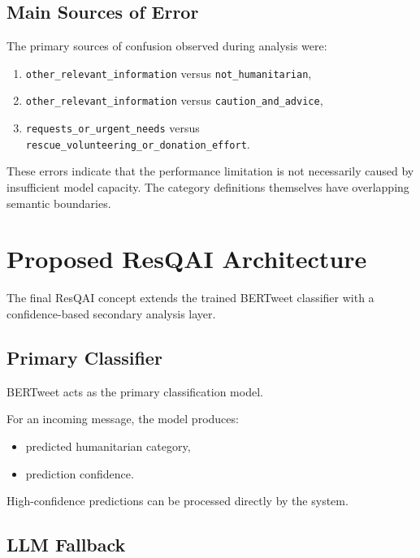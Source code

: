 \documentclass[12pt,a4paper]{article}
\begin{document}
\subsection{Main Sources of Error}

The primary sources of confusion observed during analysis were:

\begin{enumerate}
    \item \texttt{other\_relevant\_information} versus
    \texttt{not\_humanitarian},
    
    \item \texttt{other\_relevant\_information} versus
    \texttt{caution\_and\_advice},
    
    \item \texttt{requests\_or\_urgent\_needs} versus
    \texttt{rescue\_volunteering\_or\_donation\_effort}.
\end{enumerate}

These errors indicate that the performance limitation is not necessarily
caused by insufficient model capacity. The category definitions themselves
have overlapping semantic boundaries.

\section{Proposed ResQAI Architecture}

The final ResQAI concept extends the trained BERTweet classifier with a
confidence-based secondary analysis layer.

\subsection{Primary Classifier}

BERTweet acts as the primary classification model.

For an incoming message, the model produces:

\begin{itemize}
    \item predicted humanitarian category,
    \item prediction confidence.
\end{itemize}

High-confidence predictions can be processed directly by the system.

\subsection{LLM Fallback}
\end{document}
